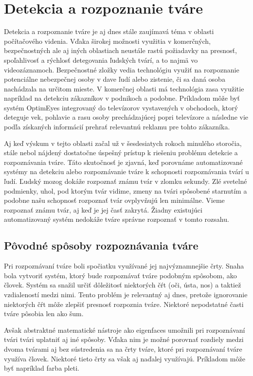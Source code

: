 \chapter{Detekcia a rozpoznanie tváre}
\label{kap:detekcia_tvare}
Detekcia a rozpoznanie tváre je aj dnes stále zaujímavá téma v oblasti počítačového videnia. 
Vďaka širokej možnosti využitia v komerčných, bezpečnostných ale aj iných oblastiach 
neustále rastú požiadavky na presnosť, spoľahlivosť a rýchlosť detegovania ľudských tvárí, a to najmä vo videozáznamoch.
Bezpečnostné zložky vedia technológiu využiť na rozpoznanie potenciálne nebezpečnej osoby v dave ľudí alebo zistenie, či sa daná osoba nachádzala na určitom mieste.
V komerčnej oblasti má technológia zasa využitie napríklad na detekciu zákazníkov v podnikoch a podobne. 
Príkladom môže byť systém OptimEyes integrovaný do televízorov vystavených v obchodoch, ktorý deteguje vek, pohlavie a rasu osoby prechádzajúcej popri televízore 
a následne vie podľa získaných informácií prehrať relevantnú reklamu pre tohto zákazníka.\par

Aj keď výskum v tejto oblasti začal už v šesdesiatych rokoch minulého storočia,
stále nebol nájdený dostatočne úspešný prístup k riešeniu problému detekcie a rozpoznávania tváre.
Táto skutočnosť je zjavná, keď porovnáme automatizované systémy na detekciu alebo rozpoznávanie tváre k schopnosti rozpoznávania tvárí u ľudí.
Ľudský mozog dokáže rozpoznať známu tvár v zlomku sekundy. 
Zlé svetelné podmienky, uhol, pod ktorým tvár vidime, zmeny na tvári spôsobené starnutím a podobne našu schopnosť rozpoznať tvár ovplyvňujú len minimálne.
Vieme rozpoznať známu tvár, aj keď je jej časť zakrytá. 
Žiadny existujúci automatizovaný systém nedokáže tváre správne rozpoznať v tomto rozsahu.

\section{Pôvodné spôsoby rozpoznávania tváre}
Pri rozpoznávaní tváre boli spočiatku využívané jej najvýznamnejšie črty. 
Snaha bola vytvoriť systém, ktorý bude rozpoznávať tváre podobným spôsobom, ako človek.
Systém sa snažil určiť dôležitosť niektorých čŕt (oči, ústa, nos) a taktiež vzdialeností medzi nimi.
Tento problém je relevantný aj dnes, pretože ignorovanie niektorých čŕt môže zlepšiť presnosť rozpoznia tváre.
Niektoré nepodstatné časti tváre pôsobia len ako šum.

Avšak abstraktné matematické nástroje ako eigenfaces umožnili pri rozpoznávaní tvári tvári uplatniť aj iné spôsoby.
Vďaka nim je možné porovnať rozdiely medzi dvoma tvárami aj bez sústredenia sa na črty tváre, ktoré pri rozpoznávaní tváre využíva človek.
Niektoré tieto črty sa však aj naďalej využívajú. Príkladom môže byť napríklad farba pleti.

